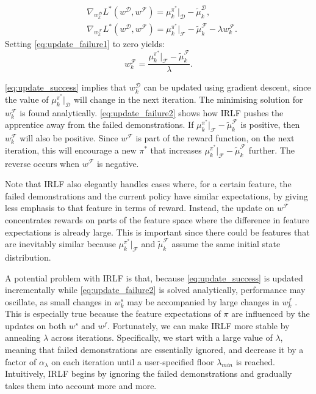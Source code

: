 \documentclass[letterpaper]{article}
\newcommand{\sw}[1]{\textcolor{red}{SW: #1}}
\newcommand{\jm}[1]{\textcolor{blue}{Joao: #1}}
\newcommand{\ks}[1]{\textcolor{green}{Kyriacos: #1}}
\newcommand{\sw}[1]{}
\newcommand{\jm}[1]{}
\newcommand{\ks}[1]{}
\begin{document}
\begin{align}
	&\nabla_{w^{\mathcal{D}}_k}L^*(w^{\mathcal{D}},w^{\mathcal{F}}) = \mu^{\pi^*}_ k|_{\mathcal{D}}- \widetilde{\mu}^{\mathcal{D}}_k \label{eq:update_success},\\
		&\nabla_{w^{\mathcal{F}}_k}L^*(w^{\mathcal{D}},w^{\mathcal{F}}) = \mu^{\pi^*}_k|_{\mathcal{F}} - \widetilde{\mu}^{\mathcal{F}}_k - \lambda w^{\mathcal{F}}_k. \label{eq:update_failure1}
\end{align}
Setting \eqref{eq:update_failure1} to zero yields:
\begin{equation}
  \label{eq:update_failure2}
  w^{\mathcal{F}}_k = \frac{\mu^{\pi^*}_k|_{\mathcal{F}} - \widetilde{\mu}^{\mathcal{F}}_k}{\lambda}.
\end{equation}
%

\noindent \eqref{eq:update_success} implies that $w^{\mathcal{D}}_k$ can be updated using gradient descent, since the value of $\mu^{\pi^*}_ k|_{\mathcal{D}}$ will change in the next iteration.
The minimising solution for $w^{\mathcal{F}}_k$ is found analytically.
\eqref{eq:update_failure2} shows how IRLF pushes the apprentice away from the failed demonstrations.  If $\mu^{\pi^*}_k|_{\mathcal{F}} - \widetilde{\mu}^{\mathcal{F}}_k$ is positive, then $w^{\mathcal{F}}_k$ will also be positive.  Since $w^{\mathcal{F}}$ is part of the reward function, on the next iteration, this will encourage a new $\pi^*$ that increases $\mu^{\pi^*}_k|_{\mathcal{F}} - \widetilde{\mu}^{\mathcal{F}}_k$ further.  The reverse occurs when $w^{\mathcal{F}}$ is negative.

Note that IRLF also elegantly handles cases where, for a certain feature, the failed demonstrations and the current policy have similar expectations, by giving less emphasis to that feature in terms of reward. Instead, the update on $w^{\mathcal{F}}$ concentrates rewards on parts of the feature space where the difference in feature expectations is already large. This is important since there could be features that are inevitably similar because $\mu^{\pi^*}_k|_{\mathcal{F}}$ 
and $\widetilde{\mu}^{\mathcal{F}}_k$ assume the same initial state distribution.


A potential problem with IRLF is that, because \eqref{eq:update_success} is updated incrementally while \eqref{eq:update_failure2} is solved analytically, performance may oscillate, as small changes in $w^s_k$ may be accompanied by large changes in $w^f_k$ 
.
This is especially true because the feature expectations of $\pi$ are influenced by the updates on both $w^s$ and $w^f$. Fortunately, we can make IRLF more stable by annealing $\lambda$ across iterations.  Specifically, we start with a large value of $\lambda$, meaning that failed demonstrations are essentially ignored, and decrease it by a factor of $\alpha_{\lambda}$ 
on each iteration until a user-specified floor $\lambda_{min}$ 
is reached.  Intuitively, IRLF begins by ignoring the failed demonstrations and gradually takes them into account more and more.
\end{document}
